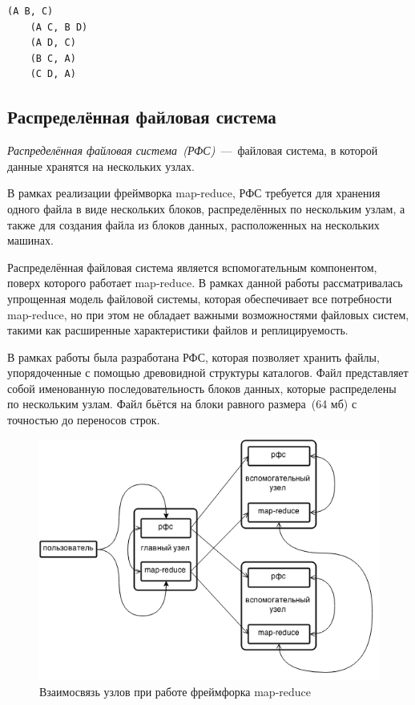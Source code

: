 \documentclass[12pt,a4paper,oneside]{extarticle}
\begin{document}
            \lstset{}
            \begin{lstlisting}[mathescape] 
    (A B, C)
    (A C, B D)
    (A D, C)
    (B C, A)
    (C D, A)
            \end{lstlisting}

    \clearpage

    \subsection{Распределённая файловая система}
        {\it Распределённая файловая система~(РФС)}~---~файловая система, в которой данные хранятся на нескольких узлах. 

        В рамках реализации фреймворка map-reduce, РФС требуется для хранения одного файла в виде нескольких блоков, распределённых по нескольким узлам, а также для создания файла из блоков данных, расположенных на нескольких машинах.

        Распределённая файловая система является вспомогательным компонентом, поверх которого работает map-reduce. В рамках данной работы рассматривалась упрощенная модель файловой системы, которая обеспечивает все потребности map-reduce, но при этом не обладает важными возможностями файловых систем, такими как расширенные характеристики файлов и реплицируемость.

        В рамках работы была разработана РФС, которая позволяет хранить файлы, упорядоченные с помощью древовидной структуры каталогов. Файл представляет собой именованную последовательность блоков данных, которые распределены по нескольким узлам. Файл бьётся на блоки равного размера~(64 мб) с точностью до переносов строк.

        \begin{figure}[h!]
            \centering
            \includegraphics[scale=0.75]{framework_total.png}
            \caption{Взаимосвязь узлов при работе фреймфорка map-reduce}
            \label{pic:framework}
        \end{figure}
        
\end{document}
